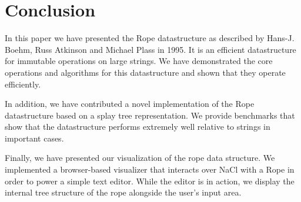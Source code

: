 \documentclass[12pt]{article}
\begin{document}

\section{Conclusion}

In this paper we have presented the Rope datastructure as described by Hans-J. Boehm, Russ Atkinson and Michael Plass in 1995. It is an efficient datastructure for immutable operations on large strings. We have demonstrated the core operations and algorithms for this datastructure and shown that they operate efficiently.

In addition, we have contributed a novel implementation of the Rope datastructure based on a splay tree representation. We provide benchmarks that show that the datastructure performs extremely well relative to strings in important cases.

Finally, we have presented our visualization of the rope data structure. We implemented a browser-based visualizer that interacts over NaCl with a Rope in order to power a simple text editor. While the editor is in action, we display the internal tree structure of the rope alongside the user's input area. 
\end{document}
